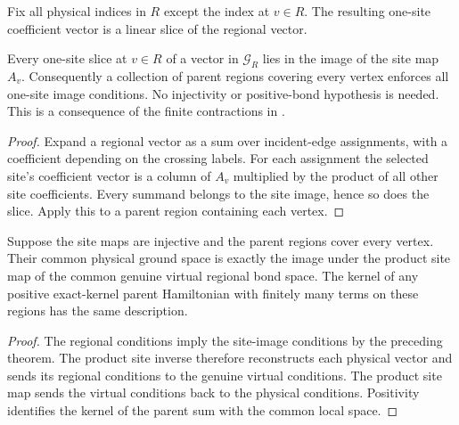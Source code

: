 \begin{definition}%
    \label{def:peps_region_vertex_physical_slice}
    \leanok
    Fix all physical indices in $R$ except the index at $v\in R$.
    The resulting one-site coefficient vector is a linear slice of
    the regional vector.
\end{definition}

\begin{lemma}%
    \label{thm:peps_region_vertex_image_support}
    \leanok
    Every one-site slice at $v\in R$ of a vector in $\mathcal G_R$
    lies in the image of the site map $A_v$. Consequently a collection
    of parent regions covering every vertex enforces all one-site
    image conditions. No injectivity or positive-bond hypothesis is
    needed. This is a consequence of the finite contractions in
    \cite[Section IV.C.1]{Cirac2021Matrix}.
\end{lemma}

\begin{proof}\leanok
    Expand a regional vector as a sum over incident-edge
    assignments, with a coefficient depending on the crossing labels.
    For each assignment the selected site's coefficient vector is a
    column of $A_v$ multiplied by the product of all other site
    coefficients. Every summand belongs to the site image, hence so
    does the slice. Apply this to a parent region containing each vertex.
\end{proof}

\begin{lemma}%
    \label{thm:peps_covering_parent_virtual_image}
    \leanok
    Suppose the site maps are injective and the parent regions cover
    every vertex. Their common physical ground space is exactly the
    image under the product site map of the common genuine virtual
    regional bond space. The kernel of any positive exact-kernel
    parent Hamiltonian with finitely many terms on these regions has the same description.
\end{lemma}

\begin{proof}\leanok
    The regional conditions imply the site-image conditions by the
    preceding theorem. The product site inverse therefore reconstructs
    each physical vector and sends its regional conditions to
    the genuine virtual conditions. The product site map sends the
    virtual conditions back to the physical conditions. Positivity
    identifies the kernel of the parent sum with the common local space.
\end{proof}
